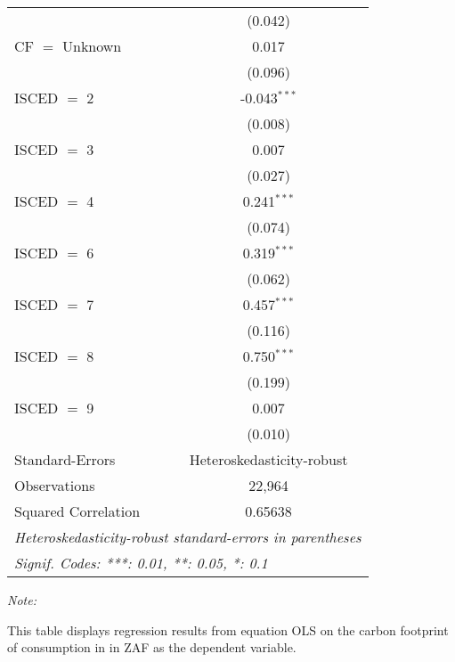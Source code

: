 \begin{table}[htbp!]
\begin{adjustbox}{width = 1\textwidth, max height = 0.95\textheight, center}
\begin{threeparttable}[b]
\begin{tabular}{lc}
                                & (0.042)\\   
            CF $=$ Unknown      & 0.017\\   
                                & (0.096)\\   
            ISCED $=$ 2         & -0.043$^{***}$\\   
                                & (0.008)\\   
            ISCED $=$ 3         & 0.007\\   
                                & (0.027)\\   
            ISCED $=$ 4         & 0.241$^{***}$\\   
                                & (0.074)\\   
            ISCED $=$ 6         & 0.319$^{***}$\\   
                                & (0.062)\\   
            ISCED $=$ 7         & 0.457$^{***}$\\   
                                & (0.116)\\   
            ISCED $=$ 8         & 0.750$^{***}$\\   
                                & (0.199)\\   
            ISCED $=$ 9         & 0.007\\   
                                & (0.010)\\   
            \midrule 
            Standard-Errors     & Heteroskedasticity-robust \\   
            Observations        & 22,964\\  
            Squared Correlation & 0.65638\\  
            \midrule \midrule
            \multicolumn{2}{l}{\emph{Heteroskedasticity-robust standard-errors in parentheses}}\\
            \multicolumn{2}{l}{\emph{Signif. Codes: ***: 0.01, **: 0.05, *: 0.1}}\\
         \end{tabular}
         
         \begin{tablenotes}\item \medskip \textit{Note:}
            \item This table displays regression results from equation OLS on the carbon footprint of consumption in  in ZAF as the dependent variable.  
         \end{tablenotes}
      \end{threeparttable}
   \end{adjustbox}
\end{table}


